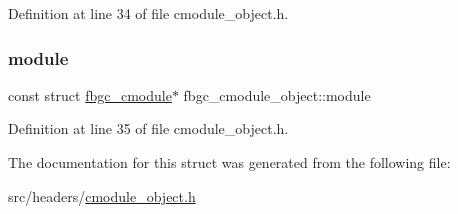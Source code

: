 Definition at line 34 of file cmodule\+\_\+object.\+h.

\mbox{\label{structfbgc__cmodule__object_a452a07b0dfcf04ac22fb76e8f1a2a097}} 
\subsubsection{\texorpdfstring{module}{module}}
{\footnotesize\ttfamily const struct \hyperlink{structfbgc__cmodule}{fbgc\+\_\+cmodule}$\ast$ fbgc\+\_\+cmodule\+\_\+object\+::module}



Definition at line 35 of file cmodule\+\_\+object.\+h.



The documentation for this struct was generated from the following file\+:\begin{DoxyCompactItemize}
\item 
src/headers/\hyperlink{cmodule__object_8h}{cmodule\+\_\+object.\+h}\end{DoxyCompactItemize}
